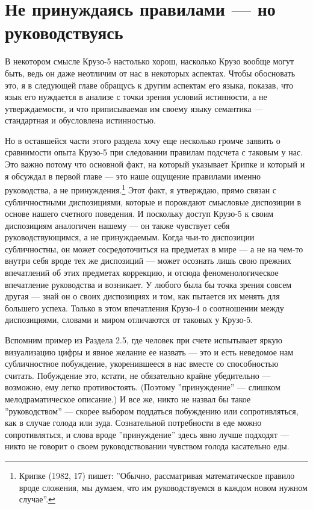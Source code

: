 \documentclass[11pt]{book}
\begin{document}
\section{Не принуждаясь правилами --- но руководствуясь}

В некотором смысле Крузо-5 настолько хорош, насколько Крузо вообще могут быть, ведь он даже неотличим от нас в некоторых аспектах. Чтобы обосновать это, я в следующей главе обращусь к другим аспектам его языка, показав, что язык его нуждается в анализе с точки зрения условий истинности, а не утверждаемости, и что приписываемая им своему языку семантика --- стандартная и обусловлена истинностью.

Но в оставшейся части этого раздела хочу еще несколько громче заявить о сравнимости опыта Крузо-5 при следовании правилам подсчета с таковым у нас. Это важно потому что основной факт, на который указывает Крипке и который и я обсуждал в первой главе --- это наше ощущение правилами именно руководства, а не принуждения.\footnote{Крипке (1982, 17) пишет: ''Обычно, рассматривая математическое правило вроде сложения, мы думаем, что им руководствуемся в каждом новом нужном случае''.} Этот факт, я утверждаю, прямо связан с субличностными диспозициями, которые и порождают смысловые диспозиции в основе нашего счетного поведения. И поскольку доступ Крузо-5 к своим диспозициям аналогичен нашему --- он также чувствует себя руководствующимся, а не принуждаемым. Когда чьи-то диспозиции субличностны, он может сосредоточиться на предметах в мире --- а не на чем-то внутри себя вроде тех же диспозиций --- может осознать лишь свою прежних впечатлений об этих предметах коррекцию, и отсюда феноменологическое впечатление руководства и возникает. У любого была бы точка зрения совсем другая --- знай он о своих диспозициях и том, как пытается их менять для большего успеха. Только в этом впечатления Крузо-4 о соотношении между диспозициями, словами и миром отличаются от таковых у Крузо-5.

Вспомним пример из Раздела 2.5, где человек при счете испытывает яркую визуализацию цифры и явное желание ее назвать --- это и есть неведомое нам субличностное побуждение, укоренившееся в нас вместе со способностью считать. Побуждение это, кстати, не обязательно крайне убедительно --- возможно, ему легко противостоять. (Поэтому ''принуждение'' --- слишком мелодраматическое описание.) И все же, никто не назвал бы такое ''руководством'' --- скорее выбором поддаться побуждению или сопротивляться, как в случае голода или зуда. Сознательной потребности в еде можно сопротивляться, и слова вроде ''принуждение'' здесь явно лучше подходят --- никто не говорит о своем руководствовании чувством голода касательно еды.
\end{document}
